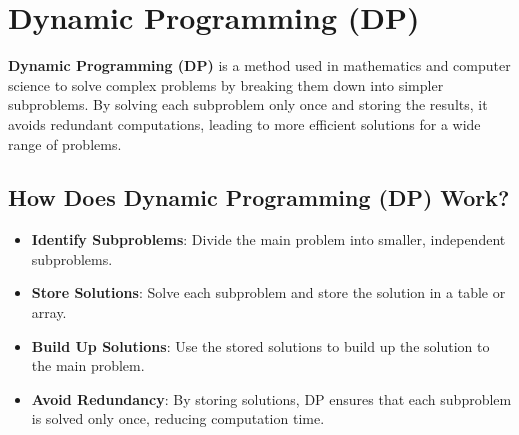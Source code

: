 \chapter{Dynamic Programming (DP) \cite{gfg-dynamic-programming}}

\textbf{Dynamic Programming (DP)} is a method used in mathematics and computer science to solve complex problems by breaking them down into simpler subproblems. By solving each subproblem only once and storing the results, it avoids redundant computations, leading to more efficient solutions for a wide range of problems.

\section{How Does Dynamic Programming (DP) Work?}

\begin{itemize}
    \item \textbf{Identify Subproblems}: Divide the main problem into smaller, independent subproblems.
    \item \textbf{Store Solutions}: Solve each subproblem and store the solution in a table or array.
    \item \textbf{Build Up Solutions}: Use the stored solutions to build up the solution to the main problem.
    \item \textbf{Avoid Redundancy}: By storing solutions, DP ensures that each subproblem is solved only once, reducing computation time.
\end{itemize}

